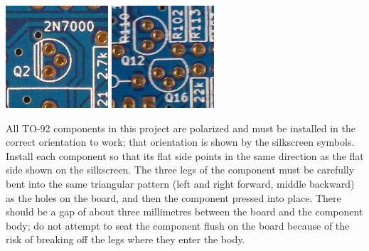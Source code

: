\noindent\includegraphics[width={1.50in}]{to92-bar.jpg}\quad
\includegraphics[width={1.50in}]{to92-nobar.jpg}

All TO-92 components in this project are polarized and must be installed in
the correct orientation to work; that orientation is shown by the silkscreen
symbols.  Install each component so that its flat side points in the same
direction as the flat side shown on the silkscreen.  The three legs of the
component must be carefully bent into the same triangular pattern (left and
right forward, middle backward) as the holes on the board, and then the
component pressed into place.  There should be a gap of about three
millimetres between the board and the component body; do not attempt to seat
the component flush on the board because of the risk of breaking off the
legs where they enter the body.


